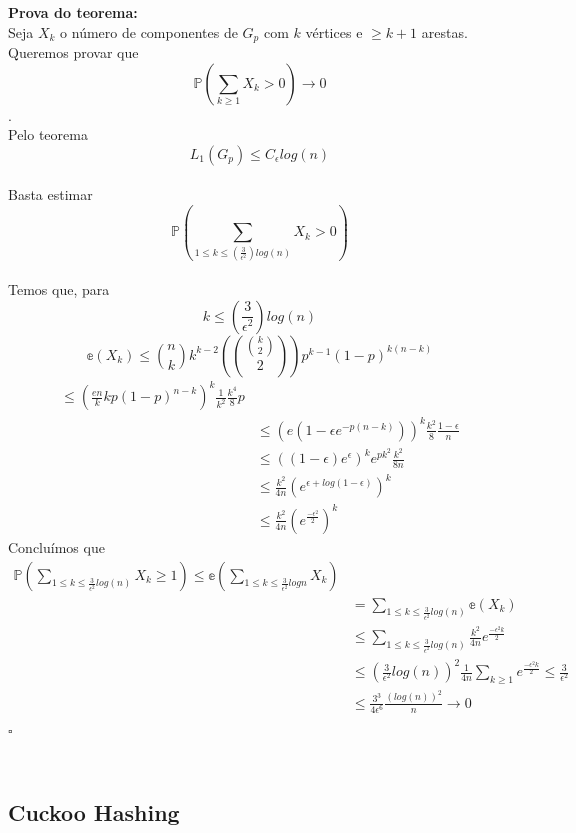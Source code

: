 \textbf{Prova do teorema:}\\

Seja $X_{k}$ o número de componentes de $G_{p}$ com $k$ vértices e $\geq k+1$ arestas.\\
Queremos provar que \[\mathbb{P}(\sum_{k\geq 1} X_{k}>0) \rightarrow 0\].\\
Pelo teorema \[L_{1}(G_{p}) \leq C_{\epsilon}log(n)\]\\
Basta estimar \[\mathbb{P}(\sum_{1\leq k \leq(\frac{3}{\epsilon^2})log(n)} X_{k} > 0)\]\\
Temos que, para \[k \leq(\frac{3}{\epsilon^2})log(n)\]
\[\mathbb{e}(X_{k})\leq {n\choose k}k^{k-2}({{k\choose 2}\choose 2})p^{k-1} (1-p)^{k(n-k)}\]
\begin{align*}
	  \leq  (\frac{en}{k}kp(1-p)^{n-k})^{k}\frac{1}{k^{2}}\frac{k^{4}}{8}p \\
	  &\leq (e(1-\epsilon e^{-p(n-k)}))^{k}\frac{k^2}{8}\frac{1-\epsilon}{n} \\
	  &\leq ((1-\epsilon)e^{\epsilon})^{k}e^{pk^{2}}\frac{k^2}{8n} \\
	  &\leq \frac{k^{2}}{4n}(e^{\epsilon+log(1-\epsilon)})^{k} \\
	  &\leq \frac{k^{2}}{4n}(e^{\frac{-\epsilon^{2}}{2}})^{k}
\end{align*}
Concluímos que
\begin{align*}
	\mathbb{P}(\sum_{1\leq k \leq \frac{3}{\epsilon^{2}}log(n)}X_{k}\geq 1) \leq \mathbb{e}(\sum_{1\leq k \leq \frac{3}{\epsilon^{2}}log n}X_{k}) \\
	&= \sum_{1\leq k \leq \frac{3}{\epsilon^{2}}log(n)} \mathbb{e}(X_{k}) \\
	&\leq \sum_{1\leq k \leq \frac{3}{\epsilon^{2}}log(n)}\frac{k^{2}}{4n} e^{\frac{-\epsilon^{2}k}{2}} \\
	&\leq (\frac{3}{\epsilon^{2}}log(n))^{2}\frac{1}{4n}\sum_{k \geq 1} e^{\frac{-\epsilon^2 k}{2}} \leq \frac{3}{\epsilon^{2}} \\
	&\leq \frac{3^{3}}{4\epsilon^{6}}\frac{(log(n))^{2}}{n} \rightarrow 0
\end{align*}

\begin{flushright}
$\square$
\end{flushright}\\

\subsection{Cuckoo Hashing}\\

